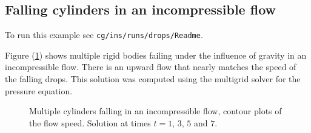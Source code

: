 \subsection{Falling cylinders in an incompressible flow}\label{sec:fallingDrops}

To run this example see {\tt cg/ins/runs/drops/Readme}.

Figure (\ref{fig:fallingCyls}) shows multiple rigid bodies failing under the influence
of gravity in an incompressible flow. 
There is an upward flow that nearly matches the speed of the falling drops.
This solution was computed using the multigrid solver for the pressure equation. 
% 
{
\newcommand{\figWidthd}{4.2cm}
\newcommand{\trimfig}[2]{\trimPlot{#1}{#2}{.24}{.22}{.02}{.085}}
\begin{figure}[hbt]
\begin{center}
\end{center}
\caption{Multiple cylinders falling in an incompressible flow, contour plots of the flow speed. Solution
  at times $t=1$, $3$, $5$ and $7$.}
\label{fig:fallingCyls}
\end{figure}
}




